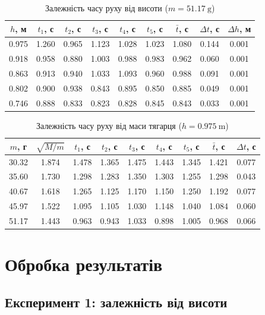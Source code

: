 \documentclass[ukrainian]{ucaphyslab}
\begin{document}
\begin{table}[H]
  \centering
  \begin{tabular}{@{}c ccccc ccc@{}}
    \toprule
    $h$, м & $t_1$, с & $t_2$, с & $t_3$, с & $t_4$, с & $t_5$, с & $\bar t$, с & $\Delta t$, с & $\Delta h$, м \\
    \midrule
    0.975 & 1.260 & 0.965 & 1.123 & 1.028 & 1.023 & 1.080 & 0.144 & 0.001 \\
    0.918 & 0.958 & 0.880 & 1.003 & 0.988 & 0.983 & 0.962 & 0.060 & 0.001 \\
    0.863 & 0.913 & 0.940 & 1.033 & 1.093 & 0.960 & 0.988 & 0.091 & 0.001 \\
    0.802 & 0.900 & 0.938 & 0.843 & 0.895 & 0.850 & 0.885 & 0.049 & 0.001 \\
    0.746 & 0.888 & 0.833 & 0.823 & 0.828 & 0.845 & 0.843 & 0.033 & 0.001 \\
    \bottomrule
  \end{tabular}
  \caption{Залежність часу руху від висоти ($m = \SI{51.17}{\gram}$)}
\end{table}

\begin{table}[H]
  \centering
  \begin{tabular}{@{}cc ccccc cc@{}}
    \toprule
    $m$, г & $\sqrt{M/m}$ & $t_1$, с & $t_2$, с & $t_3$, с & $t_4$, с & $t_5$, с & $\bar t$, с & $\Delta t$, с \\
    \midrule
    30.32 & 1.874 & 1.478 & 1.365 & 1.475 & 1.443 & 1.345 & 1.421 & 0.077 \\
    35.60 & 1.730 & 1.298 & 1.283 & 1.350 & 1.303 & 1.255 & 1.298 & 0.043 \\
    40.67 & 1.618 & 1.265 & 1.125 & 1.170 & 1.150 & 1.250 & 1.192 & 0.077 \\
    45.97 & 1.522 & 1.095 & 1.105 & 1.030 & 1.148 & 1.040 & 1.084 & 0.060 \\
    51.17 & 1.443 & 0.963 & 0.943 & 1.033 & 0.898 & 1.005 & 0.968 & 0.066 \\
    \bottomrule
  \end{tabular}
  \caption{Залежність часу руху від маси тягарця ($h = \SI{0.975}{\meter}$)}
\end{table}

\section{Обробка результатів}

\subsection{Експеримент 1: залежність від висоти}
\end{document}
